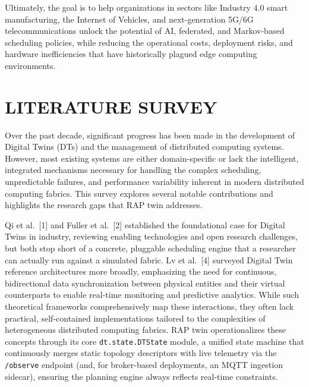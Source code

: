 \documentclass[12pt,a4]{report}
\begin{document}
Ultimately, the goal is to help organizations in sectors like Industry 4.0 smart manufacturing, the Internet of Vehicles, and next-generation 5G/6G telecommunications unlock the potential of AI, federated, and Markov-based scheduling policies, while reducing the operational costs, deployment risks, and hardware inefficiencies that have historically plagued edge computing environments.

\chapter{LITERATURE SURVEY}
\label{chap:lit-survey-anchor}

Over the past decade, significant progress has been made in the development of Digital Twins (DTs) and the management of distributed computing systems. However, most existing systems are either domain-specific or lack the intelligent, integrated mechanisms necessary for handling the complex scheduling, unpredictable failures, and performance variability inherent in modern distributed computing fabrics. This survey explores several notable contributions and highlights the research gaps that RAP twin addresses.

Qi et al.~[1] and Fuller et al.~[2] established the foundational case for Digital Twins in industry, reviewing enabling technologies and open research challenges, but both stop short of a concrete, pluggable scheduling engine that a researcher can actually run against a simulated fabric. Lv et al.~[4] surveyed Digital Twin reference architectures more broadly, emphasizing the need for continuous, bidirectional data synchronization between physical entities and their virtual counterparts to enable real-time monitoring and predictive analytics. While such theoretical frameworks comprehensively map these interactions, they often lack practical, self-contained implementations tailored to the complexities of heterogeneous distributed computing fabrics. RAP twin operationalizes these concepts through its core \texttt{dt.state.DTState} module, a unified state machine that continuously merges static topology descriptors with live telemetry via the \texttt{/observe} endpoint (and, for broker-based deployments, an MQTT ingestion sidecar), ensuring the planning engine always reflects real-time constraints.
\end{document}
